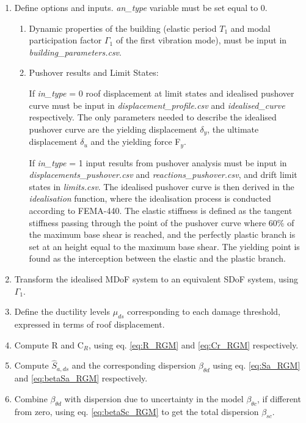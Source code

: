 \begin{enumerate}
\item Define options and inputs. \textit{an\_type} variable must be set equal to 0. 
	\begin{enumerate}
	\item Dynamic properties of the building (elastic period $T_1$ and modal participation factor $\Gamma_1$ of the first vibration mode), must be input in \textit{building\_parameters.csv}.
	\item Pushover results and Limit States:

If \textit{in\_type} = 0 roof displacement at limit states and idealised pushover curve must be input in \textit{displacement\_profile.csv} and \textit{idealised\_curve} respectively. The only 	parameters needed to describe the idealised pushover curve are the yielding displacement $\delta_y$, the ultimate displacement $\delta_u$ and the yielding force F$_y$.

If \textit{in\_type} = 1 input results from pushover analysis must be input in \textit{displacements\_pushover.csv} and \textit{reactions\_pushover.csv}, and drift limit states in \textit{limits.csv}. The idealised 	pushover curve is then derived in the \textit{idealisation} function, where the idealisation process is conducted according to FEMA-440. The elastic stiffness is defined as the 	tangent stiffness passing through the point of the pushover curve where 60\% of the maximum base shear is reached, and the perfectly plastic branch is set at an height equal to 	the maximum base shear. The yielding point is found as the interception between the elastic and the plastic branch.
	\end{enumerate}
\item Transform the idealised MDoF system to an equivalent SDoF system, using $\Gamma_1$.
\item Define the ductility levels $\mu_{ds}$ corresponding to each damage threshold, expressed in terms of roof displacement.
\item Compute R and C$_R$, using eq. \ref{eq:R_RGM} and \ref{eq:Cr_RGM} respectively.
\item Compute $\hat{S}_{a,ds}$ and the corresponding dispersion  $\beta_{\theta d}$ using eq. \ref{eq:Sa_RGM} and \ref{eq:betaSa_RGM} respectively.
\item Combine $\beta_{\theta d}$ with dispersion due to uncertainty in the model $\beta_{\theta c}$, if different from zero, using eq. \ref{eq:betaSc_RGM} to get the total dispersion $\beta_{sc}$.
\end{enumerate}


